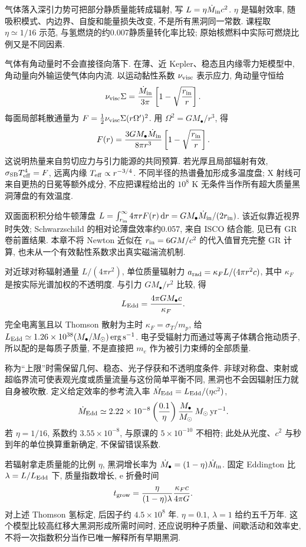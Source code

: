 气体落入深引力势可把部分静质量能转成辐射, 写 $L=\eta\dot M_{
\rm in}c^2$. $\eta$ 是辐射效率, 随吸积模式、内边界、自旋和能量损失改变, 不是所有黑洞同一常数. 课程取 $\eta\simeq1/16$ 示范, 与氢燃烧的约0.007静质量转化率比较; 原始核燃料中实际可燃烧比例又是不同因素.

气体有角动量时不会直接径向落下. 在薄、近 Kepler、稳态且内缘零力矩模型中, 角动量向外输运使气体向内流. 以运动黏性系数 $\nu_{\rm visc}$ 表示应力, 角动量守恒给
\[
\nu_{\rm visc}\Sigma=\frac{\dot M_{
\rm in}}{3\pi}\left[1-\sqrt{\frac{r_{
\rm in}}r}\right].
\]
每面局部耗散通量为 $F=\tfrac12\nu_{\rm visc}\Sigma(r\Omega')^2$. 用 $\Omega^2=GM_\bullet/r^3$, 得
\[
F(r)=\frac{3GM_\bullet\dot M_{
\rm in}}{8\pi r^3}
\left[1-\sqrt{\frac{r_{
\rm in}}r}\right].
\]
这说明热量来自剪切应力与引力能源的共同预算. 若光厚且局部辐射有效, $\sigma_{\rm SB}T_{
\rm eff}^4=F$, 远离内缘 $T_{
\rm eff}\propto r^{-3/4}$. 不同半径的热谱叠加形成多温度盘; X 射线可来自更热的日冕等额外成分, 不应把课程给出的 $10^8$ K 无条件当作所有超大质量黑洞薄盘的有效温度.

双面面积积分给牛顿薄盘 $L=\int_{r_{
\rm in}}^\infty4\pi rF(r)\,\mathrm d r=GM_\bullet\dot M_{
\rm in}/(2r_{
\rm in})$. 该近似靠近视界时失效; Schwarzschild 的相对论薄盘效率约0.057, 来自 ISCO 结合能, 见已有 GR 卷前置结果. 本章不将 Newton 近似在 $r_{
\rm in}=6GM/c^2$ 的代入值冒充完整 GR 计算, 也未从一个有效黏性系数求出真实磁湍流机制.

对近球对称辐射通量 $L/(4\pi r^2)$, 单位质量辐射力 $a_{
\rm rad}=\kappa_F L/(4\pi r^2c)$, 其中 $\kappa_F$ 是按实际光谱加权的不透明度. 与引力 $GM_\bullet/r^2$ 比较, 得
\[
L_{
\rm Edd}=\frac{4\pi GM_\bullet c}{\kappa_F}.
\]
完全电离氢且以 Thomson 散射为主时 $\kappa_F=\sigma_T/m_p$, 给 $L_{
\rm Edd}\simeq1.26\times10^{38}(M_\bullet/M_{\odot})\,\mathrm{erg\,s^{-1}}$. 电子受辐射力而通过等离子体耦合拖动质子, 所以配的是每质子质量, 不是直接把 $m_e$ 作为被引力束缚的全部质量.

称为“上限”时需保留几何、稳态、光子俘获和不透明度条件. 非球对称盘、束射或超临界流可使表观光度或质量流量与这份简单平衡不同, 黑洞也不会因辐射压力就自身被吹散. 定义给定效率的参考流入率 $\dot M_{
\rm Edd}=L_{
\rm Edd}/(\eta c^2)$,
\[
\dot M_{
\rm Edd}\simeq
2.22\times10^{-8}\left(\frac{0.1}{\eta}\right)
\frac{M_\bullet}{M_{\odot}}\,M_{\odot}\,\mathrm{yr^{-1}}.
\]
若 $\eta=1/16$, 系数约 $3.55\times10^{-8}$, 与原课的 $5\times10^{-10}$ 不相符; 此处从光度、$c^2$ 与秒到年的单位换算重新确定, 不保留错误系数.

若辐射拿走质量能的比例 $\eta$, 黑洞增长率为 $\dot M_\bullet=(1-\eta)\dot M_{
\rm in}$. 固定 Eddington 比 $\lambda=L/L_{
\rm Edd}$ 下, 质量指数增长, e 折叠时间
\[
t_{
\rm grow}=\frac{\eta}{(1-\eta)\lambda}
\frac{\kappa_Fc}{4\pi G}.
\]
对上述 Thomson 氢标定, 后因子约 $4.5\times10^8$ 年. $\eta=0.1$, $\lambda=1$ 给约五千万年. 这个模型比较高红移大黑洞形成所需时间时, 还应说明种子质量、间歇活动和效率史, 不将一次指数积分当作已唯一解释所有早期黑洞.

